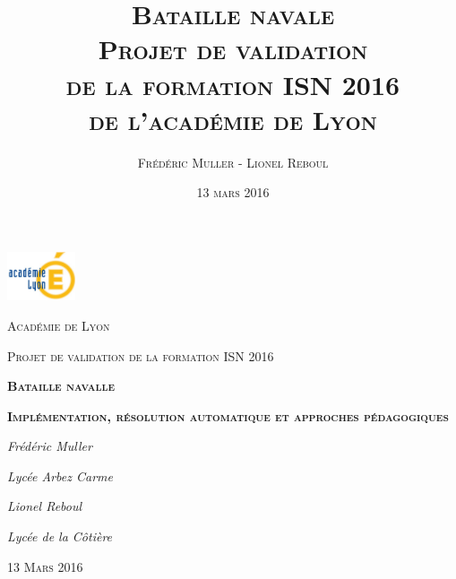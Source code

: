 \title{\Huge{\textsc{Bataille navale}}\\ \medskip \medskip\medskip\medskip \large{\textsc{Projet de validation\\de la formation ISN 2016\\de l'académie de Lyon}}}


\author{\textsc{Frédéric Muller} - \textsc{Lionel Reboul}
}
\date{\vfill \textsc{13 mars 2016}} 

\pagestyle{empty}

\begin{titlepage}
	\centering
	\includegraphics[width=0.15\textwidth]{./media/academie.jpg}\par\vspace{1cm}
	{\scshape\LARGE Académie de Lyon \par}
	\vspace{1cm}
	{\scshape\Large Projet de validation de la formation ISN 2016\par}
	\vspace{2cm}
	{\Huge\bfseries\scshape Bataille navalle\par}
	{\Large\bfseries\scshape Implémentation, résolution automatique et approches pédagogiques\par}
	\vspace{2cm}
	{\Large\itshape Frédéric Muller\par}{\large\itshape Lycée Arbez Carme\par}
	\vspace{0.8cm}
	{\Large\itshape Lionel Reboul\par}{\large\itshape Lycée de la Côtière\par}

	\vfill

	{\scshape\large 13 Mars 2016\par}
\end{titlepage}



